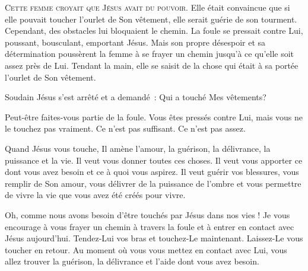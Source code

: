 \dvrule






\lettrine{C}{ette femme croyait que Jésus avait du pouvoir.}
 Elle était convaincue que si elle pouvait toucher l'ourlet de Son vêtement,
 elle serait guérie de son tourment. Cependant, des obstacles
 lui bloquaient le chemin. La foule se pressait contre Lui,
 poussant, bousculant, emportant Jésus.
 Mais son propre désespoir et sa détermination poussèrent la femme
 à se frayer un chemin jusqu'à ce qu'elle soit assez près de Lui.
 Tendant la main, elle se saisit de la chose qui était à sa portée
 \ocadr l'ourlet de Son vêtement.

Soudain Jésus s'est arrêté et a demandé~: 
 \og Qui a touché Mes vêtements? \fg{}


Peut-être faites-vous partie de la foule. Vous êtes pressés contre Lui,
 mais vous ne le touchez pas vraiment. Ce n'est pas suffisant.
 Ce n'est pas assez.

Quand Jésus vous touche, Il amène l'amour, la guérison, la délivrance,
 la puissance et la vie. Il veut vous donner toutes ces choses.
 Il veut vous  apporter ce dont vous avez besoin
 et ce à quoi vous aspirez. Il veut guérir vos blessures,
 vous remplir de Son amour, vous délivrer de la puissance de l'ombre
 et vous permettre de vivre la vie que vous avez été créés pour vivre.

Oh, comme nous avons besoin d'être touchés par Jésus dans nos vies !
 Je vous encourage à vous frayer un chemin à travers la foule
 et à entrer en contact avec Jésus aujourd'hui.
 Tendez-Lui  vos bras et touchez-Le 
 maintenant. Laissez-Le   vous toucher en retour.
 Au moment où vous vous mettez en contact avec Lui,
 vous allez trouver la guérison, la délivrance et l'aide dont vous avez besoin.

